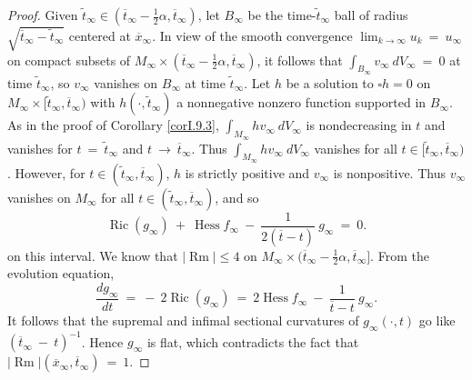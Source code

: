 \documentclass[12pt]{amsart}
\newcommand{\Hess}{\operatorname{Hess}}
\newcommand{\Ric}{\operatorname{Ric}}
\newcommand{\Rm}{\operatorname{Rm}}
\numberwithin{equation}{section}
\theoremstyle{plain}
\theoremstyle{definition}
\theoremstyle{remark}
\begin{document}
\begin{proof}
Given $\widetilde{t}_\infty \in (\overline{t}_\infty - 
\frac12 \alpha, \overline{t}_\infty)$,
let $B_\infty$ be the time-$\widetilde{t}_\infty$ ball of radius
$\sqrt{\overline{t}_\infty - \widetilde{t}_\infty}$ 
centered at $\overline{x}_\infty$.
In view of the smooth convergence 
$\lim_{k \rightarrow \infty} u_k \: = \: u_\infty$ on
compact subsets of 
$M_\infty \times (\overline{t}_\infty - \frac12 \alpha, 
\overline{t}_\infty)$,
it follows that
$\int_{B_\infty} v_\infty \: dV_\infty \: = \: 0$ at time $\widetilde{t}_\infty$, so
$v_\infty$ vanishes on $B_\infty$ at time $\widetilde{t}_\infty$. Let $h$ be a solution
to $\square h = 0$ on $M_\infty \times [\widetilde{t}_\infty, \overline{t}_\infty)$ with
$h(\cdot, \widetilde{t}_\infty)$ a nonnegative nonzero function supported in 
$B_\infty$. As in the proof of Corollary \ref{corI.9.3},
$\int_{M_\infty} h v_\infty \: dV_\infty$ is nondecreasing in $t$ and vanishes for
$t \: = \: \widetilde{t}_\infty$ and  $t \: \rightarrow \: \overline{t}_\infty$.
Thus $\int_{M_\infty} h v_\infty \: dV_\infty$ vanishes for all 
$t \in [\widetilde{t}_\infty, \overline{t}_\infty)$. However, for $t \in 
(\widetilde{t}_\infty, \overline{t}_\infty)$, $h$ is strictly positive and
$v_\infty$ is nonpositive.  Thus $v_\infty$ vanishes on $M_\infty$ for all
$t \in (\widetilde{t}_\infty, \overline{t}_\infty)$, and so
\begin{equation}
\Ric(g_\infty) \: + \: \Hess f_\infty \: - \:
\frac{1}{2(\overline{t} - t)} \: g_{\infty} \: = \: 0.
\end{equation}
on this interval.
We know that $|\Rm| \le 4$ on
$M_\infty \times (\overline{t}_\infty - 
\frac12 \alpha, \overline{t}_\infty]$. 
From the evolution equation,
\begin{equation}
\frac{dg_{\infty}}{dt} \: = \: - \: 2 \Ric(g_\infty) \: = \:
2 \Hess f_\infty \: - \:
\frac{1}{\overline{t} - t} \: g_{\infty}.
\end{equation}
It follows that the supremal and infimal
sectional curvatures of $g_\infty(\cdot,t)$ go like
$(\overline{t}_\infty \: - \: t)^{-1}$.
Hence $g_\infty$ is flat,
which contradicts the fact that 
$|\Rm|(\overline{x}_\infty, \overline{t}_\infty) \: = \: 1$.



\end{proof}
\end{document}
